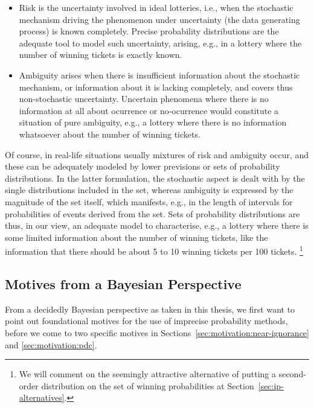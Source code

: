 \begin{itemize}
\item Risk is the uncertainty involved in ideal lotteries,
i.e., when the stochastic mechanism driving the phenomenon under uncertainty
(the data generating process) is known completely.
Precise probability distributions are the adequate tool to model such uncertainty,
arising, e.g., in a lottery where the number of winning tickets is exactly known.
\item Ambiguity arises when there is insufficient information about the stochastic mechanism,
or information about it is lacking completely, and covers thus non-stochastic uncertainty.
Uncertain phenomena where there is no information at all
about ocurrence or no-ocurrence would constitute a situation of pure ambiguity,
e.g., a lottery where there is no information whatsoever about the number of winning tickets.
\end{itemize}

Of course, in real-life situations usually mixtures of risk and ambiguity occur,
and these can be adequately modeled by lower previsions or sets of probability distributions.
In the latter formulation,
the stochastic aspect is dealt with by the single distributions included in the set,
whereas ambiguity is expressed by the magnitude of the set itself,
which manifests, e.g., in the length of intervals for probabilities of events derived from the set.
Sets of probability distributions are thus, in our view,
an adequate model to characterise, e.g.,
a lottery where there is some limited information about the number of winning tickets,
like the information that there should be about 5 to 10 winning tickets per 100 tickets.%
\footnote{We will comment on the seemingly attractive alternative
of putting a second-order distribution on the set of winning probabilities %
at Section~\ref{sec:ip-alternatives}.}

\subsection{Motives from a Bayesian Perspective}
\label{sec:motivation:bayesian}

From a decidedly Bayesian perspective as taken in this thesis,
we first want to point out foundational motives for the use of imprecise probability methods,
before we come to two specific motives in Sections~\ref{sec:motivation:near-ignorance} and \ref{sec:motivation:pdc}.

